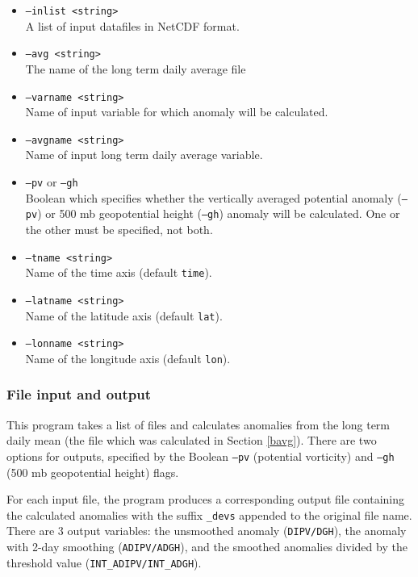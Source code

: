 \documentclass{article}
\begin{document}
\begin{itemize}
\item[]\texttt{--inlist <string>} \\ A list of input datafiles in NetCDF format. 
\item[] \texttt{--avg <string>}\\ The name of the long term daily average file 
\item[] \texttt{--varname <string>}\\Name of input variable for which anomaly will be calculated.
\item[]\texttt{--avgname <string>}\\Name of input long term daily average variable.
\item[]\texttt{--pv} or \texttt{--gh}\\Boolean which specifies whether the vertically averaged potential anomaly (\texttt{--pv}) or 500 mb geopotential height (\texttt{--gh}) anomaly will be calculated. One or the other must be specified, not both.
\item[] \texttt{--tname <string>}\\Name of the time axis (default \texttt{time}).
\item[]\texttt{--latname <string>}\\Name of the latitude axis (default \texttt{lat}).
\item[]\texttt{--lonname <string>}\\Name of the longitude axis (default \texttt{lon}).
\end{itemize}

\subsubsection{File input and output}
This program takes a list of files and calculates anomalies from the long term daily mean (the file which was calculated in Section \ref{bavg}). There are two options for outputs, specified by the Boolean \texttt{--pv} (potential vorticity) and \texttt{--gh} (500 mb geopotential height) flags. 

For each input file, the program produces a corresponding output file containing the calculated anomalies with the suffix \texttt{\_devs} appended to the original file name. There are 3 output variables: the unsmoothed anomaly (\texttt{DIPV/DGH}), the anomaly with 2-day smoothing (\texttt{ADIPV/ADGH}), and 
the smoothed anomalies divided by the threshold value (\texttt{INT\_ADIPV/INT\_ADGH}).
\end{document}
